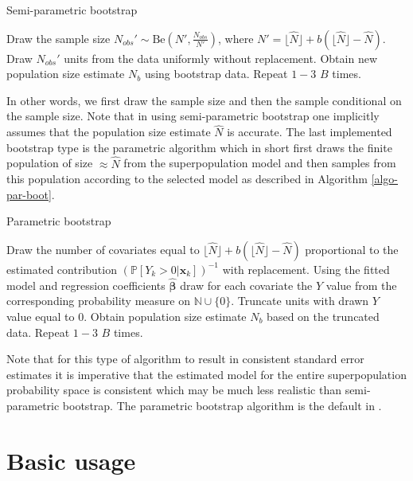 \documentclass[
]{jss}
\newcommand{\1}{\mathcal{I}} \newcommand{\bZero}{\boldsymbol{0}}
\begin{document}
\begin{algorithm}[ht!]
\small
\caption{Semi-parametric bootstrap}
\label{algo-semipar-boot}\DontPrintSemicolon
{} Draw the sample size $N_{obs}'\sim\text{Be}\left(N', \frac{N_{obs}}{N'}\right)$, where $N'=\lfloor\hat{N}\rfloor+b\left(\lfloor\hat{N}\rfloor-\hat{N}\right)$.\;
 Draw $N_{obs}'$ units from the data uniformly without replacement.\;
 Obtain new population size estimate $N_b$ using bootstrap data.\;
 Repeat $1-3$ $B$ times.
\end{algorithm}

In other words, we first draw the sample size and then the sample
conditional on the sample size. Note that in using semi-parametric
bootstrap one implicitly assumes that the population size estimate
\(\hat{N}\) is accurate. The last implemented bootstrap type is the
parametric algorithm which in short first draws the finite population of
size \(\approx\hat{N}\) from the superpopulation model and then samples
from this population according to the selected model as described in
Algorithm \ref{algo-par-boot}.

\begin{algorithm}[ht!]
\small
\caption{Parametric bootstrap}
\label{algo-par-boot}\DontPrintSemicolon
{} Draw the number of covariates equal to $\lfloor\hat{N}\rfloor+b\left(\lfloor\hat{N}\rfloor-\hat{N}\right)$ proportional to the estimated contribution $(\mathbb{P}\left[Y_{k}>0|\boldsymbol{x}_{k}\right])^{-1}$ with replacement.\;
 Using the fitted model and regression coefficients $\hat{\boldsymbol{\beta}}$ draw for each covariate the $Y$ value from the corresponding probability measure on $\mathbb{N}\cup\{0\}$.\;
 Truncate units with drawn $Y$ value equal to $0$.\;
 Obtain population size estimate $N_b$ based on the truncated data.\;
 Repeat $1-3$ $B$ times.
\end{algorithm}

Note that for this type of algorithm to result in consistent standard
error estimates it is imperative that the estimated model for the entire
superpopulation probability space is consistent which may be much less
realistic than semi-parametric bootstrap. The parametric bootstrap
algorithm is the default in .

\section{Basic usage}\label{sec-basic}
\end{document}
